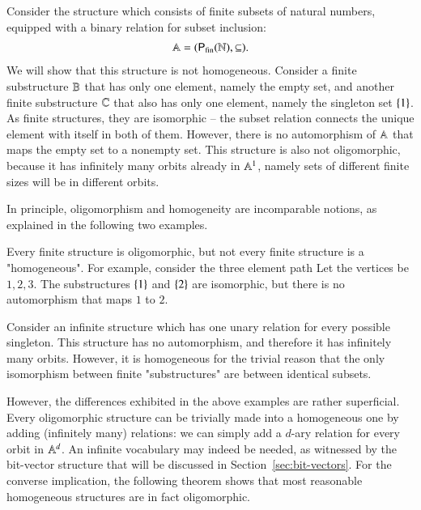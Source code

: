 	\begin{myexample}\label{ex:nat-powerset}
		Consider the structure which consists of finite subsets of  natural numbers, equipped with a binary relation for subset inclusion: 	
			\begin{align*}
				\mathbb A = ({\mathsf P}_{\text{fin}}({\mathbb N}),\subseteq).
			\end{align*}
	We will show that this structure is not homogeneous. Consider a finite substructure $\mathbb B$ that has only one element, namely the empty set, and another finite substructure $\mathbb C$ that also has only one element, namely the singleton set $\{1\}$. As finite structures, they are isomorphic -- the subset relation connects the unique element with itself in both of them. However, there is no automorphism of $\mathbb A$ that maps the empty set to a nonempty set. This structure is also not oligomorphic, because it has infinitely many orbits already in $\mathbb A^1$, namely sets of different finite sizes will be in different orbits.
		\end{myexample}

In principle, oligomorphism and homogeneity are incomparable notions, as explained in the following two examples.

\begin{myexample}
	Every finite structure is oligomorphic, but not every finite structure is a "homogeneous". For example, consider the three element path
	Let the vertices be $1,2,3$. The substructures $\{1\}$ and $\{2\}$ are isomorphic, but there is no automorphism that maps $1$ to $2$.
\end{myexample}
\begin{myexample}
Consider an infinite structure which has one unary relation for every possible singleton. This structure has no automorphism, and therefore it has infinitely many orbits. However, it is homogeneous for the trivial reason that the only isomorphism between finite "substructures" are between identical subsets.
\end{myexample}

However, the differences exhibited in the above examples are rather superficial. Every oligomorphic structure can be trivially made into a  homogeneous one by adding (infinitely many) relations: we can simply add a $d$-ary relation for every orbit in $\mathbb A^d$. An infinite vocabulary may indeed be needed, as witnessed by the bit-vector structure that will be discussed in Section~\ref{sec:bit-vectors}.
For the converse implication, the  following theorem shows that most reasonable homogeneous structures are in fact oligomorphic.

